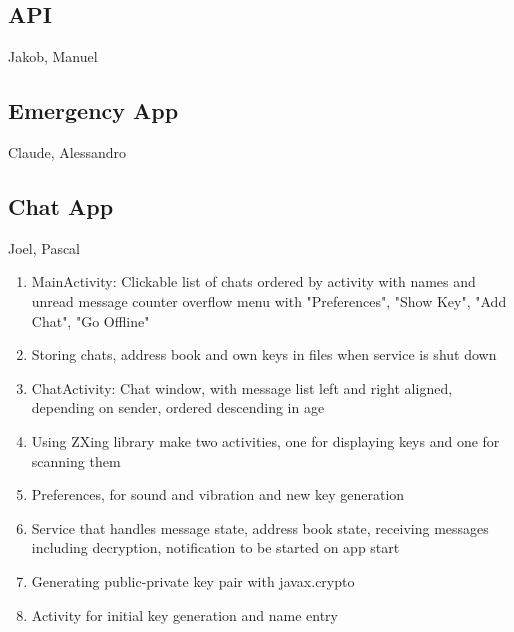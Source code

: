 	
		\subsection{API}
			Jakob, Manuel
		
		\subsection{Emergency App}
			Claude, Alessandro
		
		\subsection{Chat App}
			Joel, Pascal
			\begin{enumerate}
				\item MainActivity: Clickable list of chats ordered by activity with names and unread message counter overflow menu with "Preferences", "Show Key", "Add Chat", "Go Offline"
				\item Storing chats, address book and own keys in files when service is shut down
				\item ChatActivity: Chat window, with message list left and right aligned, depending on sender, ordered descending in age
				\item Using ZXing library make two activities, one for displaying keys and one for scanning them
				\item Preferences, for sound and vibration and new key generation
				\item Service that handles message state, address book state, receiving messages including decryption, notification to be started on app start
				\item Generating public-private key pair with javax.crypto
				\item Activity for initial key generation and name entry
			\end{enumerate}
			